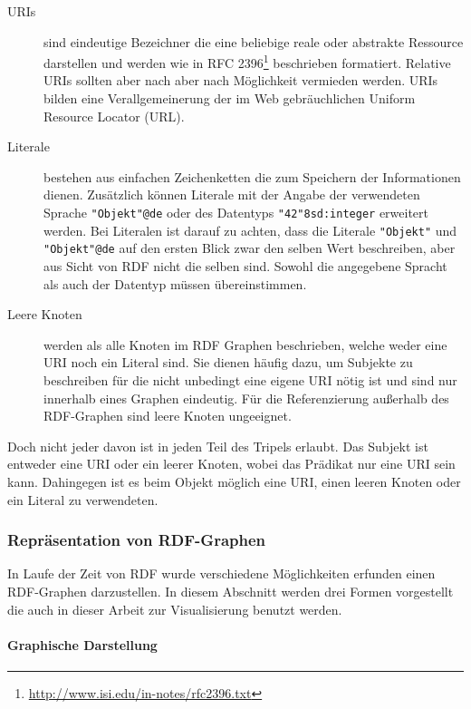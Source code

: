 \begin{description}
    \item[URIs] sind eindeutige Bezeichner die eine beliebige reale oder abstrakte Ressource darstellen und werden wie in RFC 2396\footnote{\url{http://www.isi.edu/in-notes/rfc2396.txt}} beschrieben formatiert. Relative URIs sollten aber nach \cite{Klyne2004} aber nach Möglichkeit vermieden werden. URIs bilden eine Verallgemeinerung der im Web gebräuchlichen Uniform Resource Locator (URL).
   
    \item[Literale] bestehen aus einfachen Zeichenketten die zum Speichern der Informationen dienen. Zusätzlich können Literale mit der Angabe der verwendeten Sprache \texttt{"Objekt"@de} oder des Datentyps \texttt{"42"^^xsd:integer} erweitert werden. Bei Literalen ist darauf zu achten, dass die Literale \texttt{"Objekt"} und \texttt{"Objekt"@de} auf den ersten Blick zwar den selben Wert beschreiben, aber aus Sicht von RDF nicht die selben sind. Sowohl die angegebene Spracht als auch der Datentyp müssen übereinstimmen.

    \item[Leere Knoten] werden als alle Knoten im RDF Graphen beschrieben, welche weder eine URI noch ein Literal sind. Sie dienen häufig dazu, um Subjekte zu beschreiben für die nicht unbedingt eine eigene URI nötig ist und sind nur innerhalb eines Graphen eindeutig. Für die Referenzierung außerhalb des RDF-Graphen sind leere Knoten ungeeignet.
\end{description}

Doch nicht jeder davon ist in jeden Teil des Tripels erlaubt. Das Subjekt ist entweder eine URI oder ein leerer Knoten, wobei das Prädikat nur eine URI sein kann. Dahingegen ist es beim Objekt möglich eine URI, einen leeren Knoten oder ein Literal zu verwendeten. 


\subsubsection{Repräsentation von RDF-Graphen} %
\label{ssub:darstellung_von_rdf_graphen}

In Laufe der Zeit von RDF wurde verschiedene Möglichkeiten erfunden einen RDF-Graphen darzustellen. In diesem Abschnitt werden drei Formen vorgestellt die auch in dieser Arbeit zur Visualisierung benutzt werden. 

\paragraph{Graphische Darstellung} %
\label{par:graphische_darstellung}

